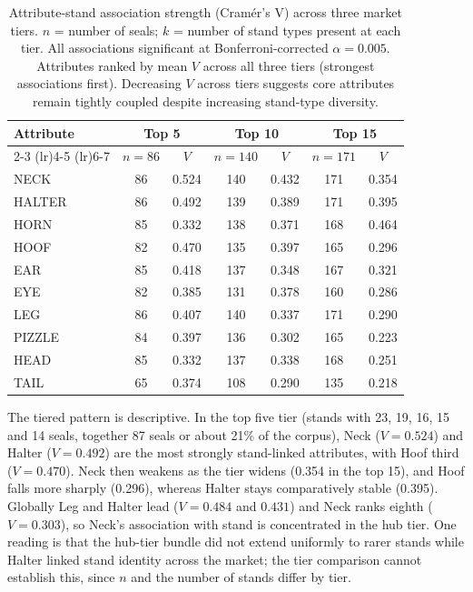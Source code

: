 \documentclass[12pt]{article}
\begin{document}
\begin{table}[H]
\centering
\caption{Attribute-stand association strength (Cram{\'e}r's V) across three market tiers.
$n$ = number of seals; $k$ = number of stand types present at each tier.
All associations significant at Bonferroni-corrected $\alpha = 0.005$.
Attributes ranked by mean $V$ across all three tiers (strongest associations first).
Decreasing $V$ across tiers suggests core attributes remain
tightly coupled despite increasing stand-type diversity.}
\label{tab:attribute_hierarchy}
\begin{tabular}{@{}lcccccc@{}}
\toprule
Attribute & \multicolumn{2}{c}{Top 5} & \multicolumn{2}{c}{Top 10} & \multicolumn{2}{c}{Top 15} \\
\cmidrule(lr){2-3} \cmidrule(lr){4-5} \cmidrule(lr){6-7}
 & $n=86$ & $V$ & $n=140$ & $V$ & $n=171$ & $V$ \\
\midrule
NECK & 86 & 0.524 & 140 & 0.432 & 171 & 0.354 \\
HALTER & 86 & 0.492 & 139 & 0.389 & 171 & 0.395 \\
HORN & 85 & 0.332 & 138 & 0.371 & 168 & 0.464 \\
HOOF & 82 & 0.470 & 135 & 0.397 & 165 & 0.296 \\
EAR & 85 & 0.418 & 137 & 0.348 & 167 & 0.321 \\
EYE & 82 & 0.385 & 131 & 0.378 & 160 & 0.286 \\
LEG & 86 & 0.407 & 140 & 0.337 & 171 & 0.290 \\
PIZZLE & 84 & 0.397 & 136 & 0.302 & 165 & 0.223 \\
HEAD & 85 & 0.332 & 137 & 0.338 & 168 & 0.251 \\
TAIL & 65 & 0.374 & 108 & 0.290 & 135 & 0.218 \\
\bottomrule
\end{tabular}
\end{table}

The tiered pattern is descriptive. In the top five tier (stands with 23, 19, 16, 15
and 14 seals, together 87 seals or about 21\% of the corpus), Neck ($V = 0.524$) and
Halter ($V = 0.492$) are the most strongly stand-linked attributes, with Hoof
third ($V = 0.470$). Neck then weakens as the tier widens (0.354 in the top 15),
and Hoof falls more sharply (0.296), whereas Halter stays comparatively stable
(0.395). Globally Leg and Halter lead ($V = 0.484$ and $0.431$) and Neck ranks
eighth ($V = 0.303$), so Neck's association with stand is concentrated in the hub
tier. One reading is that the hub-tier bundle did not extend uniformly to rarer
stands while Halter linked stand identity across the market; the tier comparison
cannot establish this, since $n$ and the number of stands differ by tier.
\end{document}
